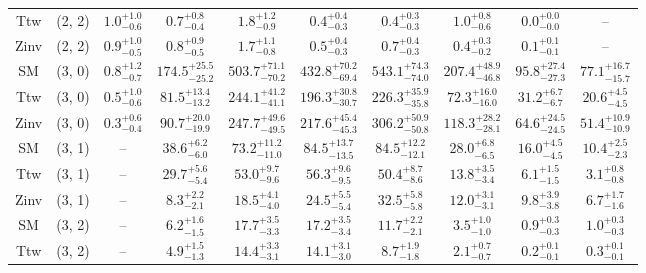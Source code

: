 \begin{table}[h!]
{\begin{tabular}{cccccccccc}
	Ttw & (2, 2) & $1.0^{+ 1.0 }_{- 0.6 }$ & $0.7^{+ 0.8 }_{- 0.4 }$ & $1.8^{+ 1.2 }_{- 0.9 }$ & $0.4^{+ 0.4 }_{- 0.3 }$ & $0.4^{+ 0.3 }_{- 0.3 }$ & $1.0^{+ 0.8 }_{- 0.6 }$ & $0.0^{+ 0.0 }_{- 0.0 }$ & -- \\[0.5ex] 
	Zinv & (2, 2) & $0.9^{+ 1.0 }_{- 0.5 }$ & $0.8^{+ 0.9 }_{- 0.5 }$ & $1.7^{+ 1.1 }_{- 0.8 }$ & $0.5^{+ 0.4 }_{- 0.3 }$ & $0.7^{+ 0.4 }_{- 0.3 }$ & $0.4^{+ 0.3 }_{- 0.2 }$ & $0.1^{+ 0.1 }_{- 0.1 }$ & -- \\[0.5ex] 
	SM & (3, 0) & $0.8^{+ 1.2 }_{- 0.7 }$ & $174.5^{+ 25.5 }_{- 25.2 }$ & $503.7^{+ 71.1 }_{- 70.2 }$ & $432.8^{+ 70.2 }_{- 69.4 }$ & $543.1^{+ 74.3 }_{- 74.0 }$ & $207.4^{+ 48.9 }_{- 46.8 }$ & $95.8^{+ 27.4 }_{- 27.3 }$ & $77.1^{+ 16.7 }_{- 15.7 }$ \\[0.5ex] 
	Ttw & (3, 0) & $0.5^{+ 1.0 }_{- 0.6 }$ & $81.5^{+ 13.4 }_{- 13.2 }$ & $244.1^{+ 41.2 }_{- 41.1 }$ & $196.3^{+ 30.8 }_{- 30.7 }$ & $226.3^{+ 35.9 }_{- 35.8 }$ & $72.3^{+ 16.0 }_{- 16.0 }$ & $31.2^{+ 6.7 }_{- 6.7 }$ & $20.6^{+ 4.5 }_{- 4.5 }$ \\[0.5ex] 
	Zinv & (3, 0) & $0.3^{+ 0.6 }_{- 0.4 }$ & $90.7^{+ 20.0 }_{- 19.9 }$ & $247.7^{+ 49.6 }_{- 49.5 }$ & $217.6^{+ 45.4 }_{- 45.3 }$ & $306.2^{+ 50.9 }_{- 50.8 }$ & $118.3^{+ 28.2 }_{- 28.1 }$ & $64.6^{+ 24.5 }_{- 24.5 }$ & $51.4^{+ 10.9 }_{- 10.9 }$ \\[0.5ex] 
	SM & (3, 1) & -- & $38.6^{+ 6.2 }_{- 6.0 }$ & $73.2^{+ 11.2 }_{- 11.0 }$ & $84.5^{+ 13.7 }_{- 13.5 }$ & $84.5^{+ 12.2 }_{- 12.1 }$ & $28.0^{+ 6.8 }_{- 6.5 }$ & $16.0^{+ 4.5 }_{- 4.5 }$ & $10.4^{+ 2.5 }_{- 2.3 }$ \\[0.5ex] 
	Ttw & (3, 1) & -- & $29.7^{+ 5.6 }_{- 5.4 }$ & $53.0^{+ 9.7 }_{- 9.6 }$ & $56.3^{+ 9.6 }_{- 9.5 }$ & $50.4^{+ 8.7 }_{- 8.6 }$ & $13.8^{+ 3.5 }_{- 3.4 }$ & $6.1^{+ 1.5 }_{- 1.5 }$ & $3.1^{+ 0.8 }_{- 0.8 }$ \\[0.5ex] 
	Zinv & (3, 1) & -- & $8.3^{+ 2.2 }_{- 2.1 }$ & $18.5^{+ 4.1 }_{- 4.0 }$ & $24.5^{+ 5.5 }_{- 5.4 }$ & $32.5^{+ 5.8 }_{- 5.8 }$ & $12.0^{+ 3.1 }_{- 3.1 }$ & $9.8^{+ 3.9 }_{- 3.8 }$ & $6.7^{+ 1.7 }_{- 1.6 }$ \\[0.5ex] 
	SM & (3, 2) & -- & $6.2^{+ 1.6 }_{- 1.5 }$ & $17.7^{+ 3.5 }_{- 3.3 }$ & $17.2^{+ 3.5 }_{- 3.4 }$ & $11.7^{+ 2.2 }_{- 2.1 }$ & $3.5^{+ 1.0 }_{- 1.0 }$ & $0.9^{+ 0.3 }_{- 0.3 }$ & $1.0^{+ 0.3 }_{- 0.3 }$ \\[0.5ex] 
	Ttw & (3, 2) & -- & $4.9^{+ 1.5 }_{- 1.3 }$ & $14.4^{+ 3.3 }_{- 3.1 }$ & $14.1^{+ 3.1 }_{- 3.0 }$ & $8.7^{+ 1.9 }_{- 1.8 }$ & $2.1^{+ 0.7 }_{- 0.7 }$ & $0.2^{+ 0.1 }_{- 0.1 }$ & $0.3^{+ 0.1 }_{- 0.1 }$ \\[0.5ex] 

\end{tabular}}
\end{table}
